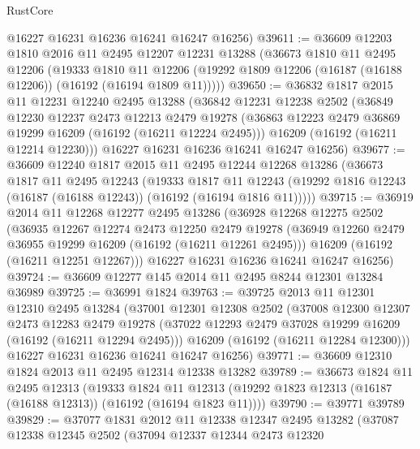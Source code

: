 \begin{lexlean}{RustCore}
\begin{coremodule}
      @16227
      @16231
      @16236
      @16241
      @16247
      @16256)
@39611 := @36609
    @12203
    @1810
    @2016
    @11
    @2495
    @12207
    @12231
    @13288
    (@36673
      @1810
      @11
      @2495
      @12206
      (@19333
        @1810
        @11
        @12206
        (@19292 @1809 @12206 (@16187 (@16188 @12206)) (@16192 (@16194 @1809 @11)))))
@39650 := @36832
    @1817
    @2015
    @11
    @12231
    @12240
    @2495
    @13288
    (@36842
      @12231
      @12238
      @2502
      (@36849
        @12230
        @12237
        @2473
        @12213
        @2479
        @19278
        (@36863 @12223 @2479 @36869 @19299 @16209 (@16192 (@16211 @12224 @2495)))
        @16209
        (@16192 (@16211 @12214 @12230)))
      @16227
      @16231
      @16236
      @16241
      @16247
      @16256)
@39677 := @36609
    @12240
    @1817
    @2015
    @11
    @2495
    @12244
    @12268
    @13286
    (@36673
      @1817
      @11
      @2495
      @12243
      (@19333
        @1817
        @11
        @12243
        (@19292 @1816 @12243 (@16187 (@16188 @12243)) (@16192 (@16194 @1816 @11)))))
@39715 := @36919
    @2014
    @11
    @12268
    @12277
    @2495
    @13286
    (@36928
      @12268
      @12275
      @2502
      (@36935
        @12267
        @12274
        @2473
        @12250
        @2479
        @19278
        (@36949 @12260 @2479 @36955 @19299 @16209 (@16192 (@16211 @12261 @2495)))
        @16209
        (@16192 (@16211 @12251 @12267)))
      @16227
      @16231
      @16236
      @16241
      @16247
      @16256)
@39724 := @36609 @12277 @145 @2014 @11 @2495 @8244 @12301 @13284 @36989
@39725 := @36991 @1824
@39763 := @39725
    @2013
    @11
    @12301
    @12310
    @2495
    @13284
    (@37001
      @12301
      @12308
      @2502
      (@37008
        @12300
        @12307
        @2473
        @12283
        @2479
        @19278
        (@37022 @12293 @2479 @37028 @19299 @16209 (@16192 (@16211 @12294 @2495)))
        @16209
        (@16192 (@16211 @12284 @12300)))
      @16227
      @16231
      @16236
      @16241
      @16247
      @16256)
@39771 := @36609 @12310 @1824 @2013 @11 @2495 @12314 @12338 @13282
@39789 := @36673
    @1824
    @11
    @2495
    @12313
    (@19333
      @1824
      @11
      @12313
      (@19292 @1823 @12313 (@16187 (@16188 @12313)) (@16192 (@16194 @1823 @11))))
@39790 := @39771 @39789
@39829 := @37077
    @1831
    @2012
    @11
    @12338
    @12347
    @2495
    @13282
    (@37087
      @12338
      @12345
      @2502
      (@37094
        @12337
        @12344
        @2473
        @12320

\end{coremodule}
\end{lexlean}
